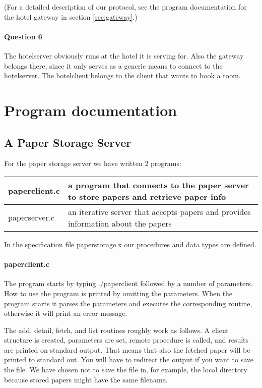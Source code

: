 \documentclass[a4paper,10pt]{article}
\begin{document}
(For a detailed description of our protocol, see the program
documentation for the hotel gateway in section \ref{sec:gateway}.) %

\paragraph{Question 6}
The hotelserver obviously runs at the hotel it is serving for. Also
the gateway belongs there, since it only serves as a generic means to
connect to the hotelserver. The hotelclient belongs to the client that
wants to book a room.

\section{Program documentation}
\subsection{A Paper Storage Server}

For the paper storage server we have written 2 programs:
\begin{center}
\begin{tabular}{ l | p{9cm} }
paperclient.c & a program that connects to the paper server to store papers and retrieve paper info\\ \hline
paperserver.c & an iterative server that accepts papers and provides information about the papers\\
\end{tabular}
\end{center}

In the specification file paperstorage.x our procedures and data types are defined.

\paragraph{paperclient.c}
The program starts by typing ./paperclient followed by a number of parameters. How to use the program is printed by omitting the parameters. When the program starts it parses the parameters and executes the corresponding routine, otherwise it will print an error message.

The add, detail, fetch, and list routines roughly work as follows. A client structure is created, parameters are set, remote procedure is called, and results are printed on standard output. That means that also the fetched paper will be printed to standard out. You will have to redirect the output if you want to save the file. We have chosen not to save the file in, for example, the local directory because stored papers might have the same filename.
\end{document}
